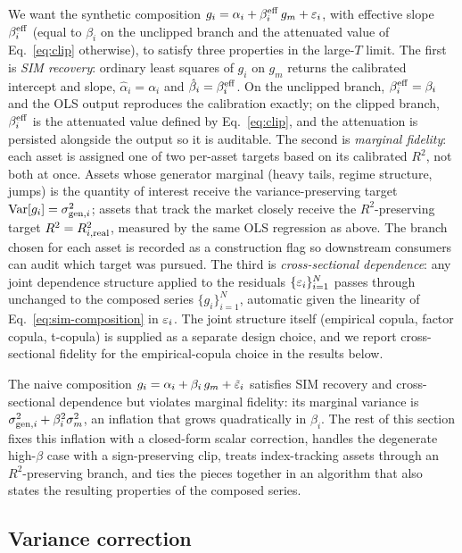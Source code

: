 We want the synthetic composition
$g_i = \alpha_i + \beta_i^{\mathrm{eff}}\, g_m + \varepsilon_i$, with effective slope
$\beta_i^{\mathrm{eff}}$ (equal to $\beta_i$ on the unclipped branch and the
attenuated value of Eq.~\eqref{eq:clip} otherwise), to satisfy three
properties in the large-$T$ limit. The first is \emph{SIM recovery}:
ordinary least squares of $g_i$ on $g_m$ returns the calibrated
intercept and slope, $\hat\alpha_i = \alpha_i$ and
$\hat\beta_i = \beta_i^{\mathrm{eff}}$. On the unclipped branch,
$\beta_i^{\mathrm{eff}} = \beta_i$ and the OLS output reproduces the
calibration exactly; on the clipped branch, $\beta_i^{\mathrm{eff}}$ is the
attenuated value defined by Eq.~\eqref{eq:clip}, and the attenuation
is persisted alongside the output so it is auditable. The second is
\emph{marginal fidelity}: each asset is assigned one of two per-asset
targets based on its calibrated $R^2$, not both at once. Assets whose
generator marginal (heavy tails, regime structure, jumps) is the
quantity of interest receive the variance-preserving target
$\operatorname{Var}[g_i] = \sigma_{\mathrm{gen},i}^2$; assets that track the market closely
receive the $R^2$-preserving target $R^2 = R^2_{i,\mathrm{real}}$, measured by
the same OLS regression as above. The branch chosen for each asset is
recorded as a construction flag so downstream consumers can audit
which target was pursued. The third is \emph{cross-sectional
dependence}: any joint dependence structure applied to the residuals
$\{\varepsilon_i\}_{i=1}^N$ passes through unchanged to the composed series
$\{g_i\}_{i=1}^N$, automatic given the linearity of
Eq.~\eqref{eq:sim-composition} in $\varepsilon_i$. The joint structure
itself (empirical copula, factor copula, t-copula) is supplied as a
separate design choice, and we report cross-sectional fidelity for
the empirical-copula choice in the results below.

The naive composition $g_i = \alpha_i + \beta_i\, g_m + \tilde{\varepsilon}_i$
satisfies SIM recovery and cross-sectional dependence but violates
marginal fidelity: its marginal variance is
$\sigma_{\mathrm{gen},i}^2 + \beta_i^2 \sigma_m^2$, an inflation that grows
quadratically in $\beta_i$. The rest of this section fixes this inflation with a closed-form
scalar correction, handles the degenerate high-$\beta$ case with a
sign-preserving clip, treats index-tracking assets through an
$R^2$-preserving branch, and ties the pieces together in an algorithm
that also states the resulting properties of the composed series.

\subsection{Variance correction}
\label{sec:method-variance}

